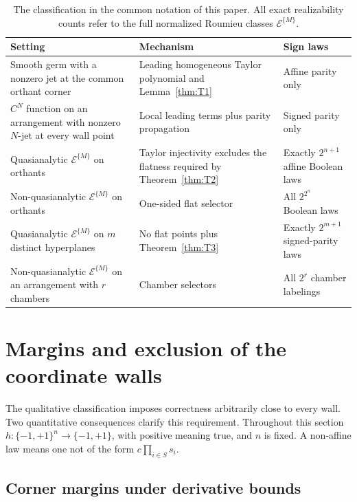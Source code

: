 \documentclass[11pt]{article}
\theoremstyle{definition}
\theoremstyle{remark}
\begin{document}
\begin{table}[t]
\centering
\caption{The classification in the common notation of this paper. All exact realizability counts refer to the full normalized Roumieu classes $\mathcal{E}^{\{M\}}$.}
\label{tab:summary}
\begin{tabularx}{\textwidth}{@{}>{\raggedright\arraybackslash}p{}X>{\raggedright\arraybackslash}p{}@{}}
\toprule
Setting & Mechanism & Sign laws \\
\midrule
Smooth germ with a nonzero jet at the common orthant corner & Leading homogeneous Taylor polynomial and Lemma~\ref{thm:T1} & Affine parity only \\
$C^N$ function on an arrangement with nonzero $N$-jet at every wall point & Local leading terms plus parity propagation & Signed parity only \\
Quasianalytic $\mathcal{E}^{\{M\}}$ on orthants & Taylor injectivity excludes the flatness required by Theorem~\ref{thm:T2} & Exactly $2^{n+1}$ affine Boolean laws \\
Non-quasianalytic $\mathcal{E}^{\{M\}}$ on orthants & One-sided flat selector & All $2^{2^n}$ Boolean laws \\
Quasianalytic $\mathcal{E}^{\{M\}}$ on $m$ distinct hyperplanes & No flat points plus Theorem~\ref{thm:T3} & Exactly $2^{m+1}$ signed-parity laws \\
Non-quasianalytic $\mathcal{E}^{\{M\}}$ on an arrangement with $r$ chambers & Chamber selectors & All $2^r$ chamber labelings \\
\bottomrule
\end{tabularx}
\end{table}

\section{Margins and exclusion of the coordinate walls}\label{sec:quantitative}

The qualitative classification imposes correctness arbitrarily close to every wall. Two quantitative consequences clarify this requirement. Throughout this section $h:\{-1,+1\}^n\to\{-1,+1\}$, with positive meaning true, and $n$ is fixed. A non-affine law means one not of the form $c\prod_{i\in S}s_i$.

\subsection{Corner margins under derivative bounds}
\end{document}
